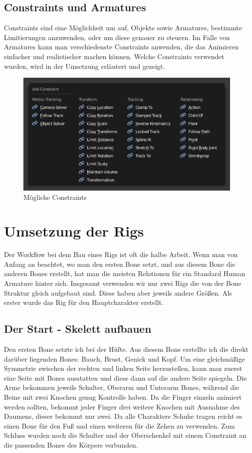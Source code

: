 \subsection{Constraints und Armatures}
Constraints sind eine Möglichkeit um auf, Objekte sowie Armatures, bestimmte Limitierungen anzuwenden,
oder um diese genauer zu steuern. Im Falle von Armatures kann man verschiedenste Constraints anwenden, die das Animieren einfacher und realistischer machen können.
Welche Constraints verwendet wurden, wird in der Umsetzung erläutert und gezeigt.

\begin{figure}[H]
    \centering

    \includegraphics[width=.8\textwidth]{images/rigging_constraints_menu.png}
    \caption{Mögliche Constraints}
\end{figure}

\section{Umsetzung der Rigs}
Der Workflow bei dem Bau eines Rigs ist oft die halbe Arbeit. Wenn man von Anfang an beachtet,
wo man den ersten Bone setzt, und aus diesem Bone die anderen Bones erstellt, hat man die meisten Relationen für ein Standard Human Armature hinter sich.
Insgesamt verwenden wir nur zwei Rigs die von der Bone Struktur gleich aufgebaut sind.
Diese haben aber jeweils andere Größen. Als erster wurde das Rig für den Hauptcharakter erstellt.

\subsection{Der Start - Skelett aufbauen}
Den ersten Bone setzte ich bei der Hüfte. Aus diesem Bone erstellte ich die direkt darüber liegenden Bones: Bauch, Brust, Genick und Kopf.
Um eine gleichmäßige Symmetrie zwischen der rechten und linken Seite herzustellen, kann man zuerst eine Seite mit Bones ausstatten und diese dann auf die andere Seite spiegeln.
Die Arme bekommen jeweils Schulter, Oberarm und Unterarm Bones, während die Beine mit zwei Knochen genug Kontrolle haben. Da die Finger einzeln animiert werden sollten,
bekommt jeder Finger drei weitere Knochen mit Ausnahme des Daumens, dieser bekommt nur zwei. Da alle Charaktere Schuhe tragen reicht es einen Bone für den Fuß und einen weiteren
für die Zehen zu verwenden.
Zum Schluss wurden noch die Schulter und der Oberschenkel mit einem Constraint an die passenden Bones des Körpers verbunden.

